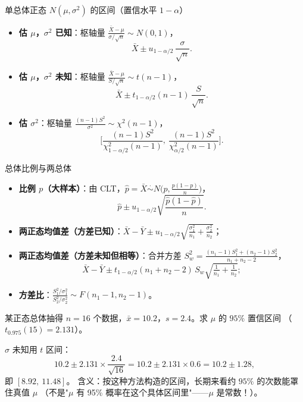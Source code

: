 \begin{kbox}{单总体正态 $N(\mu,\sigma^2)$ 的区间（置信水平 $1-\alpha$）}
\begin{itemize}[leftmargin=2em]
  \item \textbf{估 $\mu$，$\sigma^2$ 已知}：枢轴量 $\frac{\bar X-\mu}{\sigma/\sqrt n}\sim N(0,1)$，
  \[
  \bar X\pm u_{1-\alpha/2}\,\frac{\sigma}{\sqrt n}.
  \]
  \item \textbf{估 $\mu$，$\sigma^2$ 未知}：枢轴量 $\frac{\bar X-\mu}{S/\sqrt n}\sim t(n-1)$，
  \[
  \bar X\pm t_{1-\alpha/2}(n-1)\,\frac{S}{\sqrt n}.
  \]
  \item \textbf{估 $\sigma^2$}：枢轴量 $\frac{(n-1)S^2}{\sigma^2}\sim\chi^2(n-1)$，
  \[
  \Big[\frac{(n-1)S^2}{\chi^2_{1-\alpha/2}(n-1)},\ \frac{(n-1)S^2}{\chi^2_{\alpha/2}(n-1)}\Big].
  \]
\end{itemize}
\end{kbox}

\begin{kbox}{总体比例与两总体}
\begin{itemize}[leftmargin=2em]
  \item \textbf{比例 $p$（大样本）}：由 CLT，$\hat p=\bar X\overset{\cdot}{\sim}N\big(p,\frac{p(1-p)}{n}\big)$，
  \[
  \hat p\pm u_{1-\alpha/2}\sqrt{\frac{\hat p(1-\hat p)}{n}}.
  \]
  \item \textbf{两正态均值差（方差已知）}：$\bar X-\bar Y\pm u_{1-\alpha/2}\sqrt{\frac{\sigma_1^2}{n_1}+\frac{\sigma_2^2}{n_2}}$；
  \item \textbf{两正态均值差（方差未知但相等）}：合并方差
  $S_w^2=\frac{(n_1-1)S_1^2+(n_2-1)S_2^2}{n_1+n_2-2}$，
  \[
  \bar X-\bar Y\pm t_{1-\alpha/2}(n_1{+}n_2{-}2)\,S_w\sqrt{\tfrac1{n_1}+\tfrac1{n_2}};
  \]
  \item \textbf{方差比}：$\frac{S_1^2/\sigma_1^2}{S_2^2/\sigma_2^2}\sim F(n_1-1,n_2-1)$。
\end{itemize}
\end{kbox}

\begin{exbox}[置信区间计算]
某正态总体抽得 $n=16$ 个数据，$\bar x=10.2$，$s=2.4$。求 $\mu$ 的 $95\%$ 置信区间
（$t_{0.975}(15)=2.131$）。
\end{exbox}
\begin{sol}
$\sigma$ 未知用 $t$ 区间：
\[
10.2\pm2.131\times\frac{2.4}{\sqrt{16}}=10.2\pm2.131\times0.6=10.2\pm1.28,
\]
即 $[8.92,\ 11.48]$。
含义：按这种方法构造的区间，长期来看约 $95\%$ 的次数能罩住真值 $\mu$
（不是"$\mu$ 有 95\% 概率在这个具体区间里"——$\mu$ 是常数！）。
\end{sol}

